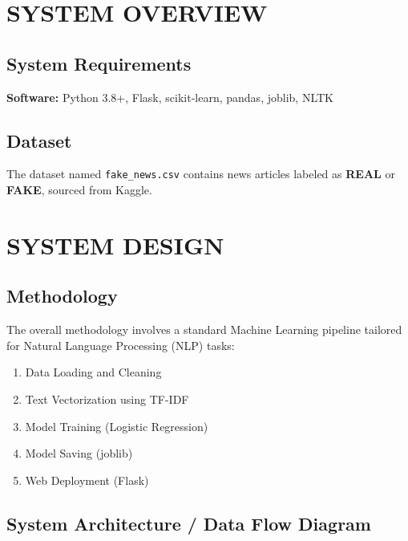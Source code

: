 \documentclass[12pt,a4paper]{report}
\begin{document}
\chapter{SYSTEM OVERVIEW}
\label{chap:overview}
\section{System Requirements}
\textbf{Software:} Python 3.8+, Flask, scikit-learn, pandas, joblib, NLTK

\section{Dataset}
The dataset named \texttt{fake\_news.csv} contains news articles labeled as \textbf{REAL} or \textbf{FAKE}, sourced from Kaggle.

\chapter{SYSTEM DESIGN}
\label{chap:design}

\section{Methodology}
The overall methodology involves a standard Machine Learning pipeline tailored for Natural Language Processing (NLP) tasks:
\begin{enumerate}
    \item Data Loading and Cleaning
    \item Text Vectorization using TF-IDF
    \item Model Training (Logistic Regression)
    \item Model Saving (joblib)
    \item Web Deployment (Flask)
\end{enumerate}

\section{System Architecture / Data Flow Diagram}
\label{sec:system_architecture}
\end{document}
